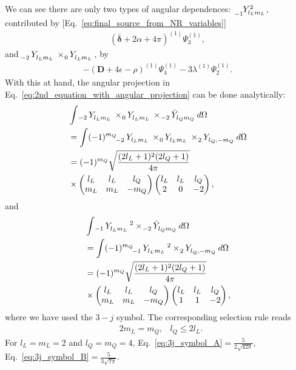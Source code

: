 \documentclass[aps,prd,amsmath,floats,floatfix, twocolumn,
superscriptaddress,nofootinbib,showpacs]{revtex4-1}
\begin{document}
We can see there are only two types of angular dependences: $\tensor[_{-1}]{{Y^2_{l_Lm_L}}}{}$, contributed by [Eq.~\eqref{eq:final_source_from_NR_variables}]
\begin{align*}
    (\bm{\bar{\delta}}+2\alpha+4\pi)^{(1)} \Psi_3^{(1)},
\end{align*}
and $\tensor[_{-2}]{Y}{_{l_Lm_L}}\times\tensor[_{0}]{Y}{_{l_Lm_L}}$, by
\begin{align*}
    -(\bm{D}+4\epsilon-\rho)^{(1)} \Psi_4^{(1)} -3\lambda^{(1)}\Psi_2^{(1)}.
\end{align*}
With this at hand, the angular projection in Eq.~\eqref{eq:2nd_equation_with_angular_projection} can be done analytically:
\begin{align}
    &\int \tensor[_{-2}]{Y}{_{l_Lm_L}}\times\tensor[_{0}]{Y}{_{l_Lm_L}}\times\tensor[_{-2}]{\bar{Y}}{_{l_Qm_Q}}   d\Omega \notag    \\
    &=\int (-1)^{m_Q}\tensor[_{-2}]{Y}{_{l_Lm_L}}\times\tensor[_{0}]{Y}{_{l_Lm_L}}\times\tensor[_{2}]{Y}{_{l_Q,-m_Q}}   d\Omega \notag \\
    &=(-1)^{m_Q}\sqrt{\frac{(2l_L+1)^2(2l_Q+1)}{4\pi}} \notag \\
    &\times
    \begin{pmatrix}
        l_L & l_L & l_Q \\
        m_L & m_L & -m_Q
    \end{pmatrix}
    \begin{pmatrix}
        l_L & l_L & l_Q \\
        2 & 0 & -2
    \end{pmatrix}, 
    \label{eq:3j_symbol_A}
\end{align}
and
\begin{align}
    &\int \tensor[_{-1}]{Y}{_{l_Lm_L}}^2\times\tensor[_{-2}]{\bar{Y}}{_{l_Qm_Q}}   d\Omega \notag \\
    &=    \int (-1)^{m_Q}\tensor[_{-1}]{Y}{_{l_Lm_L}}^2\times\tensor[_{2}]{Y}{_{l_Q,-m_Q}}   d\Omega \notag \\
    &=(-1)^{m_Q}\sqrt{\frac{(2l_L+1)^2(2l_Q+1)}{4\pi}} \notag \\
    &\times
    \begin{pmatrix}
        l_L & l_L & l_Q \\
        m_L & m_L & -m_Q
    \end{pmatrix}
    \begin{pmatrix}
        l_L & l_L & l_Q \\
        1 & 1 & -2
    \end{pmatrix},
    \label{eq:3j_symbol_B}
\end{align}
where we have used the $3-j$ symbol. The corresponding selection rule reads
\begin{align}
    &2m_L=m_Q,
    &l_Q\leq 2l_L. \label{eq:selection_rule_schwarzschild}
\end{align}
For $l_L=m_L=2$ and $l_Q=m_Q=4$, Eq.~\eqref{eq:3j_symbol_A}$=\frac{5}{2\sqrt{42\pi}}$, Eq.~\eqref{eq:3j_symbol_B}$=\frac{5}{3\sqrt{7\pi}}$.
\end{document}
